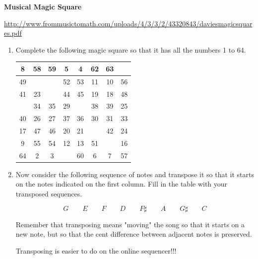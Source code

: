 \documentclass[12pt,noauthor,nooutcomes,hints,instructornotes]{ximera}%
\begin{document}
\begin{question}
\textbf{Musical Magic Square}
\begin{instructorNotes}
\url{http://www.frommusictomath.com/uploads/4/3/3/2/43320843/daviesmagicsquares.pdf }
\end{instructorNotes}

\begin{enumerate}
    \item Complete the following magic square so that it has all the numbers 1 to 64.
    
    \begin{center}
    \renewcommand{\arraystretch}{2}
\begin{tabular}{|c|c|c|c|c|c|c|c|}\hline
8 &58 &59 & 5 & 4 &62 & 63 & \hspace{20 pt} \\\hline
49 & \hspace{20 pt} & \hspace{20 pt} & 52 & 53  & 11 & 10 & 56 \\\hline
41 & 23 & \hspace{20 pt} &44 & 45 & 19 & 18 & 48 \\\hline
\hspace{20 pt} & 34 & 35 & 29 & \hspace{20 pt} & 38 & 39 & 25 \\\hline
40 & 26 & 27 & 37 & 36 & 30 & 31 & 33 \\\hline
17 & 47 & 46 & 20 & 21 & \hspace{20 pt} & 42 & 24 \\\hline
9 & 55 & 54 & 12 & 13 & 51 & \hspace{20 pt} & 16 \\\hline
64 & 2 & 3 & \hspace{20 pt} & 60 & 6 & 7 & 57 \\\hline
\end{tabular}
\end{center}

\item Now consider the following sequence of notes and transpose it so that it starts on the notes indicated on the first column. Fill in the table with your transposed sequences.

\[G \qquad E \qquad F \qquad D \qquad F\sharp \qquad A \qquad G\sharp \qquad C
\]

Remember that transposing means "moving" the song so that it starts on a new note, but so that the cent difference between adjacent notes is preserved.
\begin{hint} Transposing is easier to do on the online sequencer!!!
\end{hint}


\end{enumerate}
\end{question}
\end{document}
